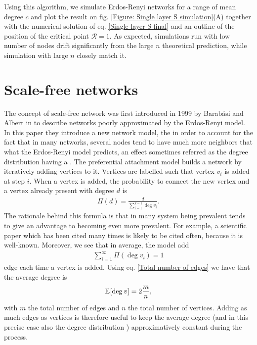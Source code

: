 \documentclass[
11pt, %
english, %
singlespacing, %
nolistspacing, %
liststotoc, %
headsepline, %
]{MastersDoctoralThesis} %
\begin{document}
Using this algorithm, we simulate Erdos-Renyi networks for a range of mean degree $c$ and plot the result on fig. \ref{Figure: Single layer S simulation}(A) together with the numerical solution of eq. \eqref{Single layer S final} and an outline of the position of the critical point $\mathcal{R} = 1$. As expected, simulations run with low number of nodes drift significantly from the large $n$ theoretical prediction, while simulation with large $n$ closely match it.

\section{Scale-free networks}
\label{Section: Scale-free networks}

The concept of scale-free network was first introduced in 1999 by Barabási and Albert in \cite{barabasi1999emergence} to describe networks poorly approximated by the Erdos-Renyi model. In this paper they introduce a new network model, the  in order to account for the fact that in many networks, several nodes tend to have much more neighbors that what the Erdos-Renyi model predicts, an effect sometimes referred as the degree distribution having a . The preferential attachment model builds a network by iteratively adding vertices to it. Vertices are labelled such that vertex $v_i$ is added at step $i$. When a vertex is added, the probability to connect the new vertex and a vertex already present with degree $d$ is
\begin{align}
	\Pi(d) = \frac{d}{\sum_{i=1}^{k - 1} \deg{v_i}}. \label{Preferential attachment probability}
\end{align}
The rationale behind this formula is that in many system being prevalent tends to give an advantage to becoming even more prevalent. For example, a scientific paper which has been cited many times is likely to be cited often, because it is well-known. Moreover, we see that in average, the model add
\begin{align}
	\sum_{i=1}^\infty \Pi(\deg{v_i}) = 1
\end{align}
edge each time a vertex is added. Using eq. \eqref{Total number of edges} we have that the average degree is
\begin{align}
	\mathbb{E}_{}\!\left[ \mathrm{deg}_{}\, v \right] = 2 \frac{m}{n},
\end{align}
with $m$ the total number of edges and $n$ the total number of vertices. Adding as much edges as vertices is therefore useful to keep the average degree (and in this precise case also the degree distribution \cite{barabasi1999emergence}) approximatively constant during the process.
\end{document}
